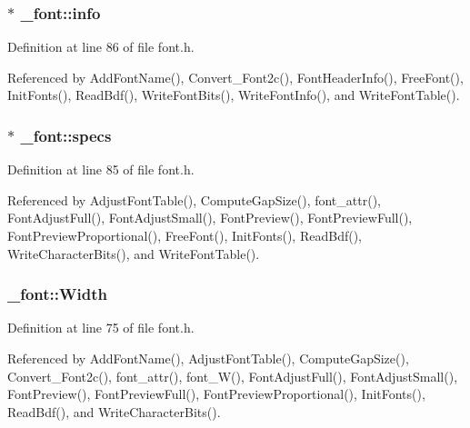 \hypertarget{struct__font_abf134e8a44e707d3b4e83ab76c952ed9}{
\subsubsection[{info}]{ $\ast$ \-\_\-font\-::info}}\label{struct__font_abf134e8a44e707d3b4e83ab76c952ed9}


Definition at line 86 of file font.\-h.



Referenced by Add\-Font\-Name(), Convert\-\_\-\-Font2c(), Font\-Header\-Info(), Free\-Font(), Init\-Fonts(), Read\-Bdf(), Write\-Font\-Bits(), Write\-Font\-Info(), and Write\-Font\-Table().

\hypertarget{struct__font_a76b5b07cf75a869627eca27d7a32836a}{
\subsubsection[{specs}]{ $\ast$ \-\_\-font\-::specs}}\label{struct__font_a76b5b07cf75a869627eca27d7a32836a}


Definition at line 85 of file font.\-h.



Referenced by Adjust\-Font\-Table(), Compute\-Gap\-Size(), font\-\_\-attr(), Font\-Adjust\-Full(), Font\-Adjust\-Small(), Font\-Preview(), Font\-Preview\-Full(), Font\-Preview\-Proportional(), Free\-Font(), Init\-Fonts(), Read\-Bdf(), Write\-Character\-Bits(), and Write\-Font\-Table().

\hypertarget{struct__font_ae3d3b48670f1bf4bf6dbf42794f81b31}{
\subsubsection[{Width}]{ \-\_\-font\-::\-Width}}\label{struct__font_ae3d3b48670f1bf4bf6dbf42794f81b31}


Definition at line 75 of file font.\-h.



Referenced by Add\-Font\-Name(), Adjust\-Font\-Table(), Compute\-Gap\-Size(), Convert\-\_\-\-Font2c(), font\-\_\-attr(), font\-\_\-\-W(), Font\-Adjust\-Full(), Font\-Adjust\-Small(), Font\-Preview(), Font\-Preview\-Full(), Font\-Preview\-Proportional(), Init\-Fonts(), Read\-Bdf(), and Write\-Character\-Bits().

